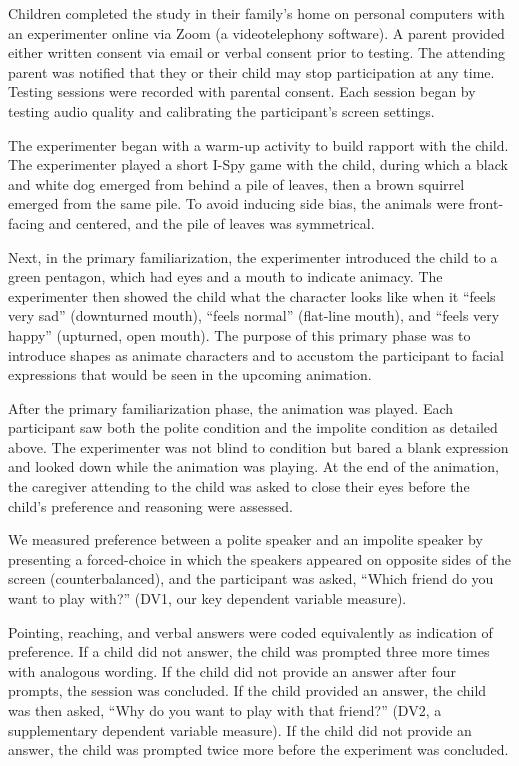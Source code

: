 \documentclass[
  english,
  man,floatsintext]{apa6}
\begin{document}
Children completed the study in their family's home on personal computers with an experimenter online via Zoom (a videotelephony software). A parent provided either written consent via email or verbal consent prior to testing. The attending parent was notified that they or their child may stop participation at any time. Testing sessions were recorded with parental consent. Each session began by testing audio quality and calibrating the participant's screen settings.

The experimenter began with a warm-up activity to build rapport with the child. The experimenter played a short I-Spy game with the child, during which a black and white dog emerged from behind a pile of leaves, then a brown squirrel emerged from the same pile. To avoid inducing side bias, the animals were front-facing and centered, and the pile of leaves was symmetrical.

Next, in the primary familiarization, the experimenter introduced the child to a green pentagon, which had eyes and a mouth to indicate animacy. The experimenter then showed the child what the character looks like when it ``feels very sad'' (downturned mouth), ``feels normal'' (flat-line mouth), and ``feels very happy'' (upturned, open mouth). The purpose of this primary phase was to introduce shapes as animate characters and to accustom the participant to facial expressions that would be seen in the upcoming animation.

After the primary familiarization phase, the animation was played. Each participant saw both the polite condition and the impolite condition as detailed above. The experimenter was not blind to condition but bared a blank expression and looked down while the animation was playing. At the end of the animation, the caregiver attending to the child was asked to close their eyes before the child's preference and reasoning were assessed.

We measured preference between a polite speaker and an impolite speaker by presenting a forced-choice in which the speakers appeared on opposite sides of the screen (counterbalanced), and the participant was asked, ``Which friend do you want to play with?'' (DV1, our key dependent variable measure).

Pointing, reaching, and verbal answers were coded equivalently as indication of preference. If a child did not answer, the child was prompted three more times with analogous wording. If the child did not provide an answer after four prompts, the session was concluded. If the child provided an answer, the child was then asked, ``Why do you want to play with that friend?'' (DV2, a supplementary dependent variable measure). If the child did not provide an answer, the child was prompted twice more before the experiment was concluded.
\end{document}
